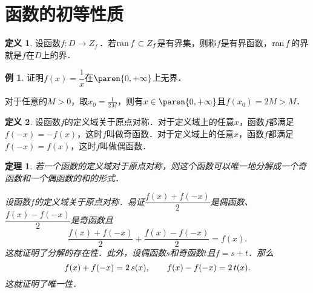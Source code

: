 \documentclass[a4paper,punct=CCT]{ctexbook}
\makeatletter
\newtheorem*{theorem*}{定理}
\theoremstyle{definition}
\newtheorem*{definition*}{定义}
\newtheorem*{example*}{例}
\theoremstyle{remark}
\renewenvironment{proof}[1][\proofname]{\par
  \pushQED{\qed}%
  \normalfont \topsep6\p@\@plus6\p@\relax
  \trivlist
  \item[]\ignorespaces
}{%
  \popQED\endtrivlist\@endpefalse
}
\makeatother
\begin{document}
\section{函数的初等性质\label{sec:funcprops}}

\begin{definition*}
  设函数\(f\colon D \to Z_f\)\,．若\(\operatorname{ran} f \subset Z_f\)是有界集，则称\(f\)是有界函数，\(\operatorname{ran} f\)的界就是\(f\)在\(D\)上的界．
\end{definition*}

\begin{example*}
  证明\(f(x) = \dfrac1x\)在\(\paren{0,+\infty}\)上无界．

  \begin{proof}
    对于任意的\(M > 0\)，取\(x_0 = \frac1{2M}\)，则有\(x \in \paren{0,+\infty}\)且\(f(x_0) = 2M > M\)．
  \end{proof}
\end{example*}

\begin{definition*}
  设函数\(f\)的定义域关于原点对称．对于定义域上的任意\(x\)，函数\(f\)都满足\(f(-x) = -f(x)\)，这时\(f\)叫做奇函数．对于定义域上的任意\(x\)，函数\(f\)都满足\(f(-x) = f(x)\)，这时\(f\)叫做偶函数．
\end{definition*}

\hypertarget{T:evenodd}{}
\begin{theorem*}
  若一个函数的定义域对于原点对称，则这个函数可以唯一地分解成一个奇函数和一个偶函数的和的形式．

  \begin{proof}
    设函数\(f\)的定义域关于原点对称．易证\(\dfrac{f(x)+f(-x)}{2}\)是偶函数、\(\dfrac{f(x)-f(-x)}{2}\)是奇函数且
    \[
      \frac{f(x)+f(-x)}{2} + \frac{f(x)-f(-x)}{2} = f(x).
    \]
    这就证明了分解的存在性．此外，设偶函数\(s\)和奇函数\(t\)且\(f = s + t\)．那么
    \[
      f(x) + f(-x) = 2\mathop{\relax\kern0pt s}\nolimits(x),
      \qquad
      f(x) - f(-x) = 2\mathop{\relax\kern0pt t}\nolimits(x).
    \]
    这就证明了唯一性．
  \end{proof}
\end{theorem*}
\end{document}
